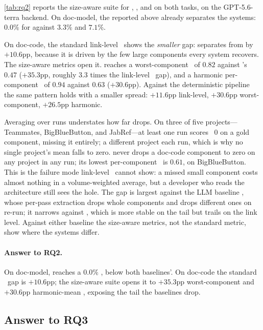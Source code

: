 \autoref{tab:rq2} reports the size-aware suite for \approach{}, \TransArc{}, and \Artemis{} on both tasks, on the GPT-5.6-terra backend.
On doc-model, the \cmrname{} reported above already separates the systems: $0.0\%$ for \approach{} against $3.3\%$ and $7.1\%$.

On doc-code, the standard link-level \fone\ shows the \emph{smaller} gap: \approach{} separates from \Artemis{} by $+10.6$pp, because it is driven by the few large components every system recovers.
The size-aware metrics open it.
\approach{} reaches a worst-component \fone\ of $0.82$ against \Artemis{}'s $0.47$ ($+35.3$pp, roughly $3.3$ times the link-level \fone\ gap), and a harmonic per-component \fone\ of $0.94$ against $0.63$ ($+30.6$pp).
Against the deterministic \TransArc{} pipeline the same pattern holds with a smaller spread: $+11.6$pp link-level, $+30.6$pp worst-component, $+26.5$pp harmonic.

Averaging over runs understates how far \Artemis{} drops.
On three of five projects---Teammates, BigBlueButton, and JabRef---at least one \Artemis{} run scores \fone\ $0$ on a gold component, missing it entirely; a different project each run, which is why no single project's mean falls to zero.
\approach{} never drops a doc-code component to zero on any project in any run; its lowest per-component \fone\ is $0.61$, on BigBlueButton.
This is the failure mode link-level \fone\ cannot show: a missed small component costs almost nothing in a volume-weighted average, but a developer who reads the architecture still sees the hole.
The gap is largest against the \ac{LLM} baseline \Artemis{}, whose per-pass extraction drops whole components and drops different ones on re-run; it narrows against \TransArc{}, which is more stable on the tail but trails on the link level.
Against either baseline the size-aware metrics, not the standard metric, show where the systems differ.

\begin{rqanswer}
\paragraph{Answer to RQ2.}
On doc-model, \approach{} reaches a $0.0\%$ \cmrname{}, below both baselines'.
On doc-code the standard \fone\ gap is $+10.6$pp; the size-aware suite opens it to $+35.3$pp worst-component and $+30.6$pp harmonic-mean \fone, exposing the tail the baselines drop.
\end{rqanswer}

\subsection{Answer to RQ3}
\label{sec:results:rq3}

